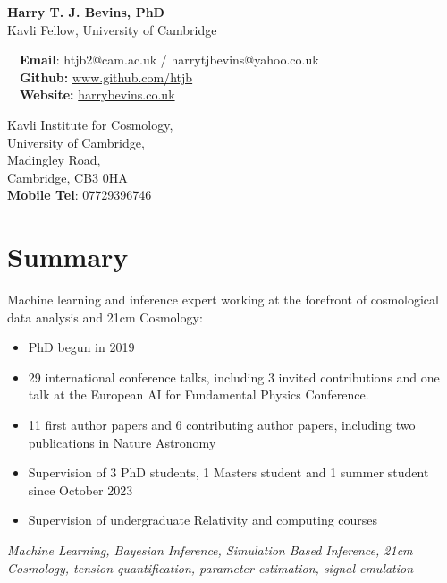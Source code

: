 \documentclass{article}
\begin{document}
\small

\begin{center}
\Large
\textbf{Harry T. J. Bevins, PhD}\\
\large
Kavli Fellow, University of Cambridge
\end{center}

\begin{minipage}[ht]{0.6\linewidth}
	\faEnvelope~~\textbf{Email}: htjb2@cam.ac.uk / harrytjbevins@yahoo.co.uk\\
	\faGithub~~\textbf{Github:} \url{www.github.com/htjb}\\
	\faGlobe~~\textbf{Website:} \url{harrybevins.co.uk}
\end{minipage}
\begin{minipage}[ht]{0.3\linewidth}
	\begin{flushright}
	Kavli Institute for Cosmology, \\
    University of Cambridge,\\
    Madingley Road,\\
    Cambridge, CB3 0HA\\
    \textbf{Mobile Tel}: 07729396746 \\
	\end{flushright}
\end{minipage}

\section*{Summary}

Machine learning and inference expert working at the forefront of cosmological data analysis and 21cm Cosmology:
\begin{itemize}
    \item PhD begun in 2019
    \item 29 international conference talks, including 3 invited contributions and one talk at the European AI for Fundamental Physics Conference.
    \item 11 first author papers and 6 contributing author papers, including two publications in Nature Astronomy
    \item Supervision of 3 PhD students, 1 Masters student and 1 summer student since October 2023
    \item Supervision of undergraduate Relativity and computing courses
    
\end{itemize}

\textit{Machine Learning, Bayesian Inference, Simulation Based Inference, 21cm Cosmology, tension quantification, parameter estimation, signal emulation}
\end{document}
